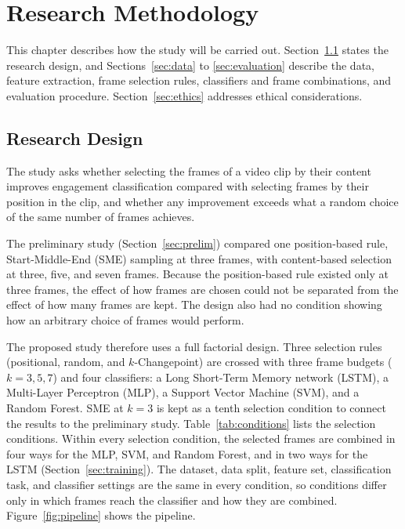 %
%
%

\chapter{Research Methodology}
\label{sec:methodology}

This chapter describes how the study will be carried out. Section~\ref{sec:design} states the research design, and Sections~\ref{sec:data} to \ref{sec:evaluation} describe the data, feature extraction, frame selection rules, classifiers and frame combinations, and evaluation procedure. Section~\ref{sec:ethics} addresses ethical considerations.



\section{Research Design}
\label{sec:design}

The study asks whether selecting the frames of a video clip by their content improves engagement classification compared with selecting frames by their position in the clip, and whether any improvement exceeds what a random choice of the same number of frames achieves.

The preliminary study (Section~\ref{sec:prelim}) compared one position-based rule, Start-Middle-End (SME) sampling at three frames, with content-based selection at three, five, and seven frames. Because the position-based rule existed only at three frames, the effect of how frames are chosen could not be separated from the effect of how many frames are kept. The design also had no condition showing how an arbitrary choice of frames would perform.

The proposed study therefore uses a full factorial design. Three selection rules (positional, random, and $k$-Changepoint) are crossed with three frame budgets ($k = 3, 5, 7$) and four classifiers: a Long Short-Term Memory network (LSTM), a Multi-Layer Perceptron (MLP), a Support Vector Machine (SVM), and a Random Forest. SME at $k = 3$ is kept as a tenth selection condition to connect the results to the preliminary study. Table~\ref{tab:conditions} lists the selection conditions. Within every selection condition, the selected frames are combined in four ways for the MLP, SVM, and Random Forest, and in two ways for the LSTM (Section~\ref{sec:training}). The dataset, data split, feature set, classification task, and classifier settings are the same in every condition, so conditions differ only in which frames reach the classifier and how they are combined. Figure~\ref{fig:pipeline} shows the pipeline.

